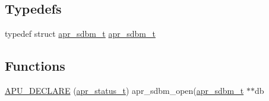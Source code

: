 \subsection*{Typedefs}
\begin{DoxyCompactItemize}
\item 
typedef struct \hyperlink{structapr__sdbm__t}{apr\+\_\+sdbm\+\_\+t} \hyperlink{group__APR__Util__DBM__SDBM_gaf24cdea6e4884036a40484259efa68c6}{apr\+\_\+sdbm\+\_\+t}
\end{DoxyCompactItemize}
\subsection*{Functions}
\begin{DoxyCompactItemize}
\item 
\hyperlink{group__APR__Util__DBM__SDBM_ga4bb60b96f7cf5537f14df8b35576dd76}{A\+P\+U\+\_\+\+D\+E\+C\+L\+A\+RE} (\hyperlink{group__apr__errno_gaa5105fa83cc322f09382292db8b47593}{apr\+\_\+status\+\_\+t}) apr\+\_\+sdbm\+\_\+open(\hyperlink{structapr__sdbm__t}{apr\+\_\+sdbm\+\_\+t} $\ast$$\ast$db
\end{DoxyCompactItemize}
